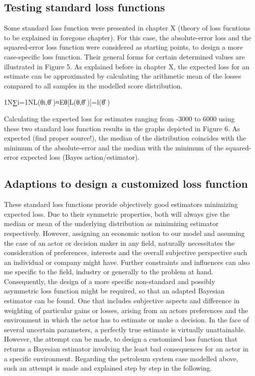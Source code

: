 	\subsection{Testing standard loss functions}
	
	Some standard loss function were presented in chapter X (theory of loss fucntions to be explained in foregone chapter). For this case, the absolute-error loss and the squared-error loss function were considered as starting points, to design a more case-specific loss function. Their general forms for certain determined values are illustrated in Figure 5.
	As explained before in chapter X, the expected loss for an estimate can be approximated by calculating the arithmetic mean of the losses compared to all samples in the modelled score distribution.
	
	1N∑i=1NL(θi,θ̂ )≈Eθ[L(θ,θ̂ )]=l(θ̂ )
	
	Calculating the expected loss for estimates ranging from -3000 to 6000 using these two standard loss function results in the graphs depicted in Figure 6. As expected (find proper source!), the median of the distribution coincides with the minimum of the absolute-error and the median with the minimum of the squared-error expected loss (Bayes action/estimator).
	
	\subsection{Adaptions to design a customized loss function}
	
	These standard loss functions provide objectively good estimators minimizing expected loss. Due to their symmetric properties, both will always give the median or mean of the underlying distribution as minimizing estimator respectively. However, assigning an economic notion to our model and assuming the case of an actor or decision maker in any field, naturally necessitates the consideration of preferences, interests and the overall subjective perspective such an individual or company might have. Further constraints and influences can also me specific to the field, industry or generally to the problem at hand. Consequently, the design of a more specific non-standard and possibly asymmetric loss function might be required, so that an adapted Bayesian estimator can be found. One that includes subjective aspects and difference in weighting of particular gains or losses, arising from an actors preferences and the environment in which the actor has to estimate or make a decision. In the face of several uncertain parameters, a perfectly true estimate is virtually unattainable. However, the attempt can be made, to design a customized loss function that returns a Bayesian estimator involving the least bad consequences for an actor in a specific environment. Regarding the petroleum system case modelled above, such an attempt is made and explained step by step in the following. 
	
